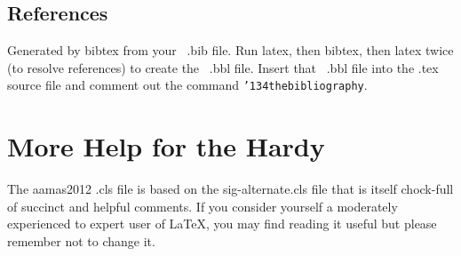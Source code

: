\documentclass{aamas2012}
\begin{document}
\subsection{References}
Generated by bibtex from your ~.bib file.  Run latex,
then bibtex, then latex twice (to resolve references)
to create the ~.bbl file.  Insert that ~.bbl file into
the .tex source file and comment out
the command \texttt{{\char'134}thebibliography}.
\section{More Help for the Hardy}
The aamas2012 .cls file is based on the
sig-alternate.cls file that is itself chock-full of succinct and
helpful comments.  If you consider yourself a moderately experienced
to expert user of \LaTeX, you may find reading it useful but please
remember not to change it.
\end{document}
